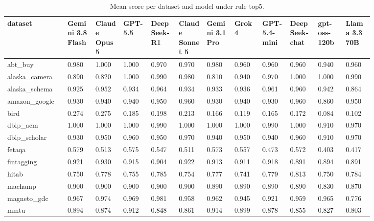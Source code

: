 \begin{landscape}
\tiny
\setlength{\tabcolsep}{3pt}
\begin{longtable}{p{0.134\linewidth}p{0.067\linewidth}p{0.067\linewidth}p{0.067\linewidth}p{0.067\linewidth}p{0.067\linewidth}p{0.067\linewidth}p{0.067\linewidth}p{0.067\linewidth}p{0.067\linewidth}p{0.067\linewidth}p{0.067\linewidth}}
\caption{Mean score per dataset and model under rule top5.}\label{tab:per_dataset_mean_top5}\\
\toprule
dataset & Gemini 3.8 Flash & Claude Opus 5 & GPT-5.5 & DeepSeek-R1 & Claude Sonnet 5 & Gemini 3.1 Pro & Grok 4 & GPT-5.4-mini & DeepSeek-chat & gpt-oss-120b & Llama 3.3 70B \\
\midrule
abt\_\allowbreak{}buy & 0.980 & 1.000 & 1.000 & 0.970 & 0.970 & 0.980 & 0.960 & 0.960 & 0.960 & 0.940 & 0.960 \\
alaska\_\allowbreak{}camera & 0.890 & 0.820 & 1.000 & 0.990 & 0.980 & 0.810 & 0.940 & 0.970 & 1.000 & 1.000 & 0.990 \\
alaska\_\allowbreak{}schema & 0.925 & 0.952 & 0.934 & 0.964 & 0.934 & 0.933 & 0.936 & 0.961 & 0.960 & 0.942 & 0.864 \\
amazon\_\allowbreak{}google & 0.930 & 0.940 & 0.940 & 0.950 & 0.960 & 0.930 & 0.940 & 0.930 & 0.960 & 0.860 & 0.950 \\
bird & 0.274 & 0.275 & 0.185 & 0.198 & 0.213 & 0.166 & 0.119 & 0.165 & 0.172 & 0.084 & 0.102 \\
dblp\_\allowbreak{}acm & 1.000 & 1.000 & 1.000 & 0.990 & 1.000 & 1.000 & 1.000 & 0.990 & 1.000 & 0.910 & 0.970 \\
dblp\_\allowbreak{}scholar & 0.930 & 0.950 & 0.960 & 0.950 & 0.970 & 0.940 & 0.950 & 0.940 & 0.960 & 0.910 & 0.970 \\
fetaqa & 0.579 & 0.513 & 0.575 & 0.547 & 0.511 & 0.573 & 0.557 & 0.473 & 0.572 & 0.403 & 0.417 \\
fintagging & 0.921 & 0.930 & 0.915 & 0.904 & 0.922 & 0.913 & 0.911 & 0.918 & 0.891 & 0.894 & 0.891 \\
hitab & 0.750 & 0.778 & 0.755 & 0.785 & 0.754 & 0.777 & 0.741 & 0.779 & 0.813 & 0.750 & 0.784 \\
machamp & 0.900 & 0.900 & 0.900 & 0.900 & 0.900 & 0.890 & 0.890 & 0.890 & 0.890 & 0.830 & 0.870 \\
magneto\_\allowbreak{}gdc & 0.967 & 0.974 & 0.969 & 0.981 & 0.958 & 0.962 & 0.945 & 0.921 & 0.959 & 0.965 & 0.776 \\
mmtu & 0.894 & 0.874 & 0.912 & 0.848 & 0.861 & 0.914 & 0.899 & 0.878 & 0.855 & 0.827 & 0.803 \\

\end{longtable}
\end{landscape}
